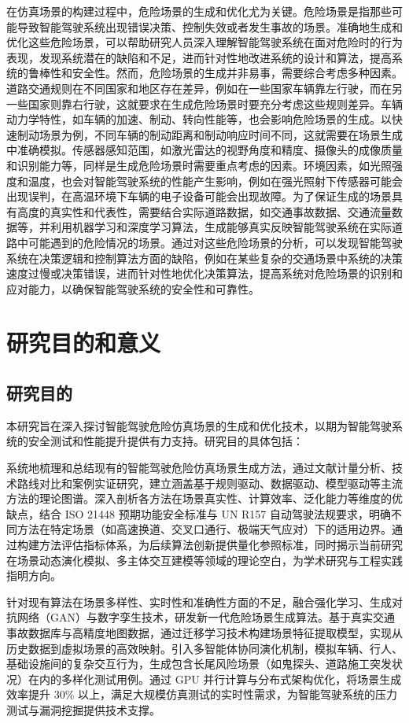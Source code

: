在仿真场景的构建过程中，危险场景的生成和优化尤为关键。危险场景是指那些可能导致智能驾驶系统出现错误决策、控制失效或者发生事故的场景。准确地生成和优化这些危险场景，可以帮助研究人员深入理解智能驾驶系统在面对危险时的行为表现，发现系统潜在的缺陷和不足，进而针对性地改进系统的设计和算法，提高系统的鲁棒性和安全性。然而，危险场景的生成并非易事，需要综合考虑多种因素。道路交通规则在不同国家和地区存在差异，例如在一些国家车辆靠左行驶，而在另一些国家则靠右行驶，这就要求在生成危险场景时要充分考虑这些规则差异。车辆动力学特性，如车辆的加速、制动、转向性能等，也会影响危险场景的生成。以快速制动场景为例，不同车辆的制动距离和制动响应时间不同，这就需要在场景生成中准确模拟。传感器感知范围，如激光雷达的视野角度和精度、摄像头的成像质量和识别能力等，同样是生成危险场景时需要重点考虑的因素。环境因素，如光照强度和温度，也会对智能驾驶系统的性能产生影响，例如在强光照射下传感器可能会出现误判，在高温环境下车辆的电子设备可能会出现故障。为了保证生成的场景具有高度的真实性和代表性，需要结合实际道路数据，如交通事故数据、交通流量数据等，并利用机器学习和深度学习算法，生成能够真实反映智能驾驶系统在实际道路中可能遇到的危险情况的场景。通过对这些危险场景的分析，可以发现智能驾驶系统在决策逻辑和控制算法方面的缺陷，例如在某些复杂的交通场景中系统的决策速度过慢或决策错误，进而针对性地优化决策算法，提高系统对危险场景的识别和应对能力，以确保智能驾驶系统的安全性和可靠性。



\section{研究目的和意义}

\subsection{研究目的}
本研究旨在深入探讨智能驾驶危险仿真场景的生成和优化技术，以期为智能驾驶系统的安全测试和性能提升提供有力支持。研究目的具体包括：

系统地梳理和总结现有的智能驾驶危险仿真场景生成方法，通过文献计量分析、技术路线对比和案例实证研究，建立涵盖基于规则驱动、数据驱动、模型驱动等主流方法的理论图谱。深入剖析各方法在场景真实性、计算效率、泛化能力等维度的优缺点，结合 ISO 21448 预期功能安全标准与 UN R157 自动驾驶法规要求，明确不同方法在特定场景（如高速换道、交叉口通行、极端天气应对）下的适用边界。通过构建方法评估指标体系，为后续算法创新提供量化参照标准，同时揭示当前研究在场景动态演化模拟、多主体交互建模等领域的理论空白，为学术研究与工程实践指明方向。​

针对现有算法在场景多样性、实时性和准确性方面的不足，融合强化学习、生成对抗网络（GAN）与数字孪生技术，研发新一代危险场景生成算法。基于真实交通事故数据库与高精度地图数据，通过迁移学习技术构建场景特征提取模型，实现从历史数据到虚拟场景的高效映射。引入多智能体协同演化机制，模拟车辆、行人、基础设施间的复杂交互行为，生成包含长尾风险场景（如鬼探头、道路施工突发状况）在内的多样化测试用例。通过 GPU 并行计算与分布式架构优化，将场景生成效率提升 30\% 以上，满足大规模仿真测试的实时性需求，为智能驾驶系统的压力测试与漏洞挖掘提供技术支撑。​

